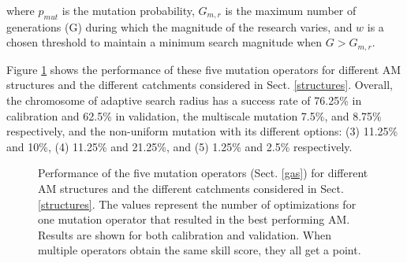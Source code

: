 \documentclass[draft]{agujournal2019}
\begin{document}
where $p_{mut}$ is the mutation probability, $G_{m,r}$ is the maximum number of generations (G) during which the magnitude of the research varies, and $w$ is a chosen threshold to maintain a minimum search magnitude when $G>G_{m,r}$.

Figure \ref{fig_mutation_operators_perfs} shows the performance of these five mutation operators for different AM structures and the different catchments considered in Sect. \ref{structures}. Overall, the chromosome of adaptive search radius has a success rate of 76.25\% in calibration and 62.5\% in validation, the multiscale mutation 7.5\%, and 8.75\% respectively, and the non-uniform mutation with its different options: (3) 11.25\% and 10\%, (4) 11.25\% and 21.25\%, and (5) 1.25\% and 2.5\% respectively.

\begin{figure}[hbt]
	\noindent{}
	\caption{Performance of the five mutation operators (Sect. \ref{gas}) for different AM structures and the different catchments considered in Sect. \ref{structures}. The values represent the number of optimizations for one mutation operator that resulted in the best performing AM. Results are shown for both calibration and validation. When multiple operators obtain the same skill score, they all get a point.}
	\label{fig_mutation_operators_perfs}
\end{figure}
\end{document}
